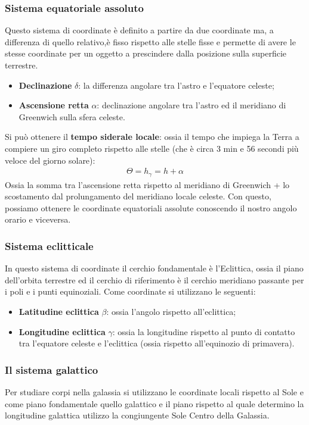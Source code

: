 \documentclass[a4paper, oneside]{book}
\begin{document}
\subsubsection{Sistema equatoriale assoluto}
Questo sistema di coordinate è definito a partire da due coordinate
ma, a differenza di quello relativo,è fisso rispetto alle stelle fisse e
permette di avere le stesse coordinate per un oggetto a prescindere
dalla posizione sulla superficie terrestre.
\begin{itemize}
    \item \textbf{Declinazione} $\delta$: la differenza angolare tra l'astro e l'equatore celeste;
    \item \textbf{Ascensione retta} $\alpha$: declinazione angolare tra l'astro ed il meridiano di Greenwich 
    sulla sfera celeste. 
\end{itemize}
Si può ottenere il \textbf{tempo siderale locale}: ossia il tempo che
impiega la Terra a compiere un giro completo rispetto alle stelle (che è circa 3 min e 56 secondi più veloce
del giorno solare):
\begin{align}
    \Theta = h_{\gamma} = h + \alpha
\end{align}
Ossia la somma tra l'ascensione retta rispetto al meridiano di Greenwich +
lo scostamento dal prolungamento del meridiano locale celeste.
Con questo, possiamo ottenere le coordinate equatoriali assolute
conoscendo il nostro angolo orario e viceversa. 

\subsubsection{Sistema eclitticale}
In questo sistema di coordinate il cerchio fondamentale è l'Eclittica, ossia
il piano dell'orbita terrestre ed il cerchio di riferimento è il cerchio 
meridiano passante per i poli e i punti equinoziali. Come coordinate si utilizzano
le seguenti:
\begin{itemize}
  \item \textbf{Latitudine eclittica} $\beta$: ossia l'angolo rispetto all'eclittica;
  \item \textbf{Longitudine eclittica} $\gamma$: ossia la longitudine rispetto al punto di contatto tra l'equatore
  celeste e l'eclittica (ossia rispetto all'equinozio di primavera). 
\end{itemize}

\subsubsection{Il sistema galattico}
Per studiare corpi nella galassia si utilizzano le coordinate locali rispetto 
al Sole e come piano fondamentale quello galattico e il piano rispetto al quale
determino la longitudine galattica utilizzo la congiungente Sole Centro della Galassia.
\end{document}
